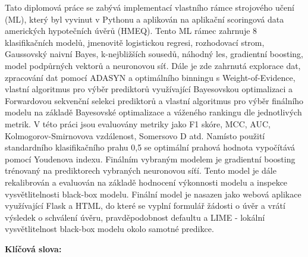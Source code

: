 Tato diplomov\'{a} pr\'{a}ce se zab\'{y}v\'{a} implementac\'{i} vlastn\'{i}ho r\'{a}mce strojov\'{e}ho u\v{c}en\'{i} (ML), kter\'{y} byl vyvinut v Pythonu a aplikov\'{a}n na aplika\v{c}n\'{i} scoringov\'{a} data americk\'{y}ch hypote\v{c}n\'{i}ch \'{u}v\v{e}r\r{u} (HMEQ).
Tento ML r\'{a}mec zahrnuje 8 klasifika\v{c}n\'{i}ch model\r{u}, jmenovit\v{e} logistickou regresi, rozhodovac\'{i} strom, Gaussovsk\'{y} naivn\'{i} Bayes, k-nejbli\v{z}\v{s}\'{i}ch soused\r{u}, n\'{a}hodn\'{y} les, gradientn\'{i} boosting, model podp\r{u}rn\'{y}ch vektor\r{u} a neuronovou s\'{i}\v{t}.
D\'{a}le je zde zahrnut\'{a} explorace dat, zpracov\'{a}n\'{i} dat pomoc\'{i} ADASYN a optim\'{a}ln\'{i}ho binningu s Weight-of-Evidence, vlastn\'{i} algoritmus pro v\'{y}b\v{e}r prediktor\r{u} vyu\v{z}\'{i}vaj\'{i}c\'{i} Bayesovskou optimalizaci a Forwardovou sekven\v{c}n\'{i} selekci prediktor\r{u} a
vlastn\'{i} algoritmus pro v\'{y}b\v{e}r fin\'{a}ln\'{i}ho modelu na z\'{a}klad\v{e} Bayesovsk\'{e} optimalizace a v\'{a}\v{z}en\'{e}ho rankingu dle jednotliv\'{y}ch metrik. V t\'{e}to pr\'{a}ci jsou evaluov\'{a}ny metriky jako F1 sk\'{o}re, MCC, AUC, Kolmogorov-Smirnovova vzd\'{a}lenost, Somersovo D atd.
Nam\'{i}sto pou\v{z}it\'{i} standardn\'{i}ho klasifika\v{c}n\'{i}ho prahu 0,5 se optim\'{a}ln\'{i} prahov\'{a} hodnota vypo\v{c}\'{i}t\'{a}v\'{a} pomoc\'{i} Youdenova indexu.
Fin\'{a}ln\'{i}m vybran\'{y}m modelem je gradientn\'{i} boosting tr\'{e}novan\'{y} na prediktorech vybran\'{y}ch neuronovou s\'{i}\v{t}\'{i}.
Tento model je d\'{a}le rekalibrov\'{a}n a evaluov\'{a}n na z\'{a}klad\v{e} hodnocen\'{i} v\'{y}konnosti modelu a inspekce vysv\v{e}tlitelnosti black-box modelu.
Fin\'{a}ln\'{i} model je nasazen jako webov\'{a} aplikace vyu\v{z}\'{i}vaj\'{i}c\'{i} Flask a HTML, do kter\'{e} se vypln\'{i} formul\'{a}\v{r} \v{z}\'{a}dosti o \'{u}v\v{e}r a vr\'{a}t\'{i} v\'{y}sledek o schv\'{a}len\'{i} \'{u}v\v{e}ru, pravd\v{e}podobnost defaultu a LIME - lok\'{a}ln\'{i} vysv\v{e}tlitelnost black-box modelu okolo samotn\'{e} predikce.

\bigskip

\textbf{Kl\'{i}\v{c}ov\'{a} slova:} \Klic

